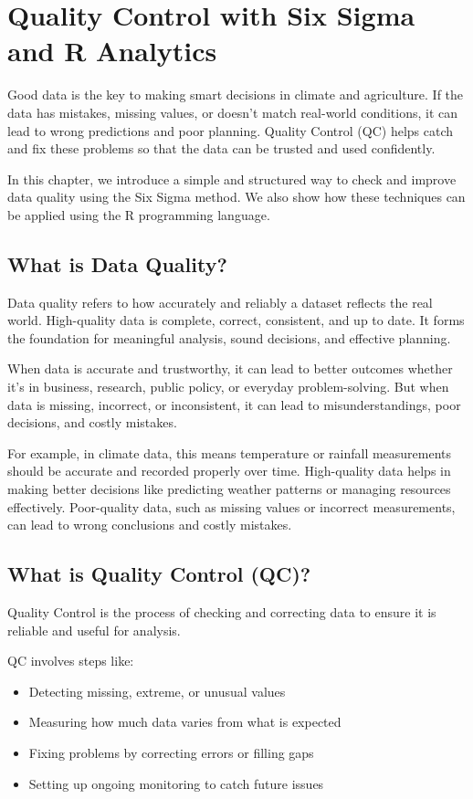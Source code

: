 \chapter{Quality Control with Six Sigma and R Analytics}

Good data is the key to making smart decisions in climate and agriculture. If the data has mistakes, missing values, or doesn't match real-world conditions, it can lead to wrong predictions and poor planning. Quality Control (QC) helps catch and fix these problems so that the data can be trusted and used confidently.

In this chapter, we introduce a simple and structured way to check and improve data quality using the Six Sigma method. We also show how these techniques can be applied using the R programming language.

\section{What is Data Quality?}

Data quality refers to how accurately and reliably a dataset reflects the real world. High-quality data is complete, correct, consistent, and up to date. It forms the foundation for meaningful analysis, sound decisions, and effective planning.

When data is accurate and trustworthy, it can lead to better outcomes whether it's in business, research, public policy, or everyday problem-solving. But when data is missing, incorrect, or inconsistent, it can lead to misunderstandings, poor decisions, and costly mistakes.

For example, in climate data, this means temperature or rainfall measurements should be accurate and recorded properly over time. High-quality data helps in making better decisions like predicting weather patterns or managing resources effectively. Poor-quality data, such as missing values or incorrect measurements, can lead to wrong conclusions and costly mistakes.

\section{What is Quality Control (QC)?}

Quality Control is the process of checking and correcting data to ensure it is reliable and useful for analysis.

QC involves steps like:
\begin{itemize}
  \item Detecting missing, extreme, or unusual values
  \item Measuring how much data varies from what is expected
  \item Fixing problems by correcting errors or filling gaps
  \item Setting up ongoing monitoring to catch future issues
\end{itemize}

